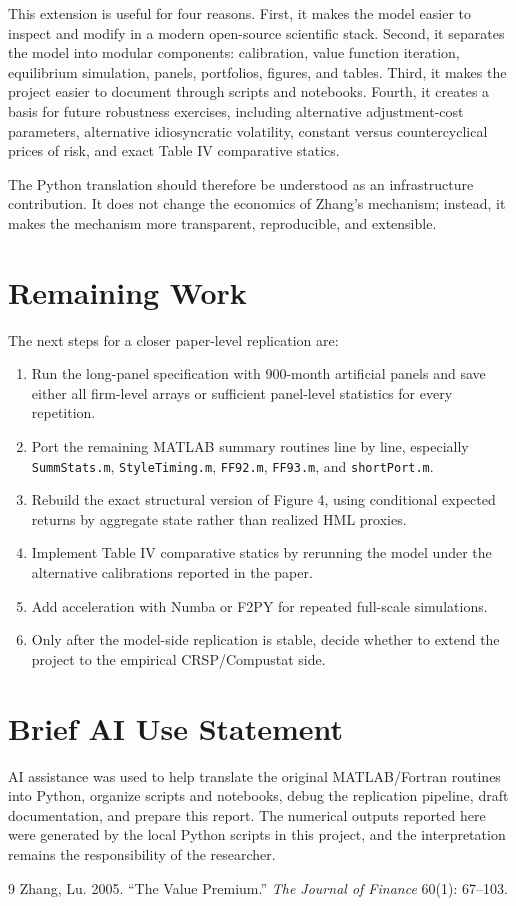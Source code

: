 \documentclass[11pt]{article}
\begin{document}
This extension is useful for four reasons. First, it makes the model easier to inspect and modify in a modern open-source scientific stack. Second, it separates the model into modular components: calibration, value function iteration, equilibrium simulation, panels, portfolios, figures, and tables. Third, it makes the project easier to document through scripts and notebooks. Fourth, it creates a basis for future robustness exercises, including alternative adjustment-cost parameters, alternative idiosyncratic volatility, constant versus countercyclical prices of risk, and exact Table IV comparative statics.

The Python translation should therefore be understood as an infrastructure contribution. It does not change the economics of Zhang's mechanism; instead, it makes the mechanism more transparent, reproducible, and extensible.

\section{Remaining Work}

The next steps for a closer paper-level replication are:

\begin{enumerate}
  \item Run the long-panel specification with 900-month artificial panels and save either all firm-level arrays or sufficient panel-level statistics for every repetition.
  \item Port the remaining MATLAB summary routines line by line, especially \texttt{SummStats.m}, \texttt{StyleTiming.m}, \texttt{FF92.m}, \texttt{FF93.m}, and \texttt{shortPort.m}.
  \item Rebuild the exact structural version of Figure 4, using conditional expected returns by aggregate state rather than realized HML proxies.
  \item Implement Table IV comparative statics by rerunning the model under the alternative calibrations reported in the paper.
  \item Add acceleration with Numba or F2PY for repeated full-scale simulations.
  \item Only after the model-side replication is stable, decide whether to extend the project to the empirical CRSP/Compustat side.
\end{enumerate}

\section{Brief AI Use Statement}

AI assistance was used to help translate the original MATLAB/Fortran routines into Python, organize scripts and notebooks, debug the replication pipeline, draft documentation, and prepare this report. The numerical outputs reported here were generated by the local Python scripts in this project, and the interpretation remains the responsibility of the researcher.

\begin{thebibliography}{9}
Zhang, Lu. 2005. ``The Value Premium.'' \textit{The Journal of Finance} 60(1): 67--103.
\end{thebibliography}
\end{document}

